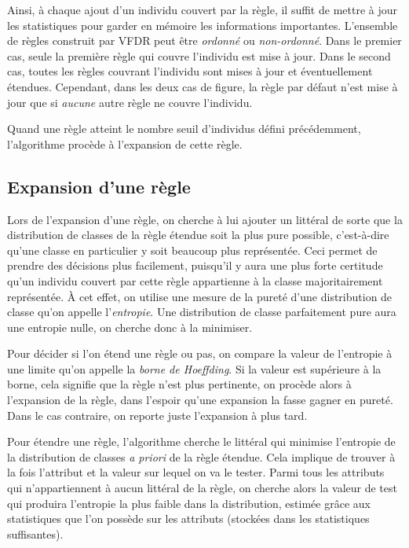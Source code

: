             Ainsi, à chaque ajout d’un individu couvert par la règle, il suffit de mettre à jour les statistiques pour garder en mémoire les informations importantes. L’ensemble de règles construit par VFDR peut être \emph{ordonné} ou \emph{non-ordonné}. Dans le premier cas, seule la première règle qui couvre l’individu est mise à jour. Dans le second cas, toutes les règles couvrant l’individu sont mises à jour et éventuellement étendues. Cependant, dans les deux cas de figure, la règle par défaut n’est mise à jour que si \emph{aucune} autre règle ne couvre l’individu.

            Quand une règle atteint le nombre seuil d’individus défini précédemment, l’algorithme procède à l'expansion de cette règle.

        \subsection{Expansion d'une règle}

            Lors de l’expansion d’une règle, on cherche à lui ajouter un littéral de sorte que la distribution de classes de la règle étendue soit la plus pure possible, c’est-à-dire qu’une classe en particulier y soit beaucoup plus représentée. Ceci permet de prendre des décisions plus facilement, puisqu’il y aura une plus forte certitude qu’un individu couvert par cette règle appartienne à la classe majoritairement représentée. À cet effet, on utilise une mesure de la pureté d’une distribution de classe qu’on appelle l’\emph{entropie}. Une distribution de classe parfaitement pure aura une entropie nulle, on cherche donc à la minimiser.
            
            Pour décider si l'on étend une règle ou pas, on compare la valeur de l'entropie à une limite qu'on appelle la \emph{borne de Hoeffding}. Si la valeur est supérieure à la borne, cela signifie que la règle n'est plus pertinente, on procède alors à l'expansion de la règle, dans l'espoir qu'une expansion la fasse gagner en pureté. Dans le cas contraire, on reporte juste l'expansion à plus tard.

            Pour étendre une règle, l’algorithme cherche le littéral qui minimise l’entropie de la distribution de classes \emph{a priori} de la règle étendue. Cela implique de trouver à la fois l’attribut et la valeur sur lequel on va le tester. Parmi tous les attributs qui n’appartiennent à aucun littéral de la règle, on cherche alors la valeur de test qui produira l’entropie la plus faible dans la distribution, estimée grâce aux statistiques que l’on possède sur les attributs (stockées dans les statistiques suffisantes).

